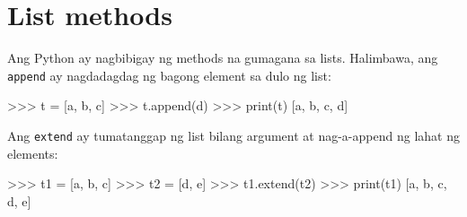 \documentclass[10pt,]{book}
\newenvironment{Shaded}{}{}
\newcommand{\BuiltInTok}[1]{\textcolor[rgb]{0.00,0.50,0.00}{#1}}
\newcommand{\NormalTok}[1]{#1}
\newcommand{\OperatorTok}[1]{\textcolor[rgb]{0.40,0.40,0.40}{#1}}
\newcommand{\StringTok}[1]{\textcolor[rgb]{0.25,0.44,0.63}{#1}}
\begin{document}
\section{List methods}\label{list-methods}

 

Ang Python ay nagbibigay ng methods na gumagana sa lists. Halimbawa, ang
\texttt{append} ay nagdadagdag ng bagong element sa dulo ng list:

 

\begin{Shaded}
\begin{Highlighting}[]
\OperatorTok{\textgreater{}\textgreater{}\textgreater{}}\NormalTok{ t }\OperatorTok{=}\NormalTok{ [}\StringTok{\textquotesingle{}a\textquotesingle{}}\NormalTok{, }\StringTok{\textquotesingle{}b\textquotesingle{}}\NormalTok{, }\StringTok{\textquotesingle{}c\textquotesingle{}}\NormalTok{]}
\OperatorTok{\textgreater{}\textgreater{}\textgreater{}}\NormalTok{ t.append(}\StringTok{\textquotesingle{}d\textquotesingle{}}\NormalTok{)}
\OperatorTok{\textgreater{}\textgreater{}\textgreater{}} \BuiltInTok{print}\NormalTok{(t)}
\NormalTok{[}\StringTok{\textquotesingle{}a\textquotesingle{}}\NormalTok{, }\StringTok{\textquotesingle{}b\textquotesingle{}}\NormalTok{, }\StringTok{\textquotesingle{}c\textquotesingle{}}\NormalTok{, }\StringTok{\textquotesingle{}d\textquotesingle{}}\NormalTok{]}
\end{Highlighting}
\end{Shaded}

Ang \texttt{extend} ay tumatanggap ng list bilang argument at
nag-a-append ng lahat ng elements:

 

\begin{Shaded}
\begin{Highlighting}[]
\OperatorTok{\textgreater{}\textgreater{}\textgreater{}}\NormalTok{ t1 }\OperatorTok{=}\NormalTok{ [}\StringTok{\textquotesingle{}a\textquotesingle{}}\NormalTok{, }\StringTok{\textquotesingle{}b\textquotesingle{}}\NormalTok{, }\StringTok{\textquotesingle{}c\textquotesingle{}}\NormalTok{]}
\OperatorTok{\textgreater{}\textgreater{}\textgreater{}}\NormalTok{ t2 }\OperatorTok{=}\NormalTok{ [}\StringTok{\textquotesingle{}d\textquotesingle{}}\NormalTok{, }\StringTok{\textquotesingle{}e\textquotesingle{}}\NormalTok{]}
\OperatorTok{\textgreater{}\textgreater{}\textgreater{}}\NormalTok{ t1.extend(t2)}
\OperatorTok{\textgreater{}\textgreater{}\textgreater{}} \BuiltInTok{print}\NormalTok{(t1)}
\NormalTok{[}\StringTok{\textquotesingle{}a\textquotesingle{}}\NormalTok{, }\StringTok{\textquotesingle{}b\textquotesingle{}}\NormalTok{, }\StringTok{\textquotesingle{}c\textquotesingle{}}\NormalTok{, }\StringTok{\textquotesingle{}d\textquotesingle{}}\NormalTok{, }\StringTok{\textquotesingle{}e\textquotesingle{}}\NormalTok{]}
\end{Highlighting}
\end{Shaded}
\end{document}
